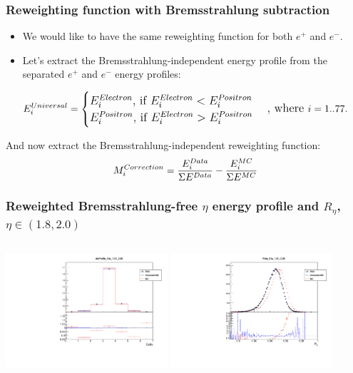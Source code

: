 \documentclass{beamer}
\begin{document}
\begin{frame}
\frametitle{Reweighting function with Bremsstrahlung subtraction}
\begin{itemize}
\item We would like to have the same reweighting function for both $e^+$ and $e^-$. 
\item Let's extract the Bremsstrahlung-independent energy profile from the separated $e^+$ and $e^-$ energy profiles:
\end{itemize}
\begin{equation}
\nonumber
   \large {E_{i}^{Universal}} = \begin{cases}
{E_{i}^{Electron}}\text{, if }E_{i}^{Electron} < E_{i}^{Positron}\\
{E_{i}^{Positron}}\text{, if } E_{i}^{Electron} > E_{i}^{Positron}\\
\end{cases}
\text{, where } i = 1..77.
\end{equation}
\begin{itemize}

\end{itemize}
\item And now extract the Bremsstrahlung-independent reweighting function:
\begin{equation}
\nonumber
   \large {M_{i}^{Correction} = \frac{E_{i}^{Data}}{\Sigma E^{Data}} - \frac{E_{i}^{MC}}{\Sigma E^{MC}}}
\end{equation}
\end{frame}
\begin{frame}
\frametitle{Reweighted Bremsstrahlung-free $\eta$ energy profile and $R_\eta$, $\eta \in (1.8, 2.0)$}

\begin{columns}[t]
\centering
\includegraphics[width=6cm]{etaProfile_Rew_Eta_18_20_Local_Rew_noBS.pdf}
\centering
\includegraphics[width=6cm]{Reta_Rew_Eta_18_20_Local_Rew_noBS.pdf}
\end{columns}
\end{frame}
\end{document}
